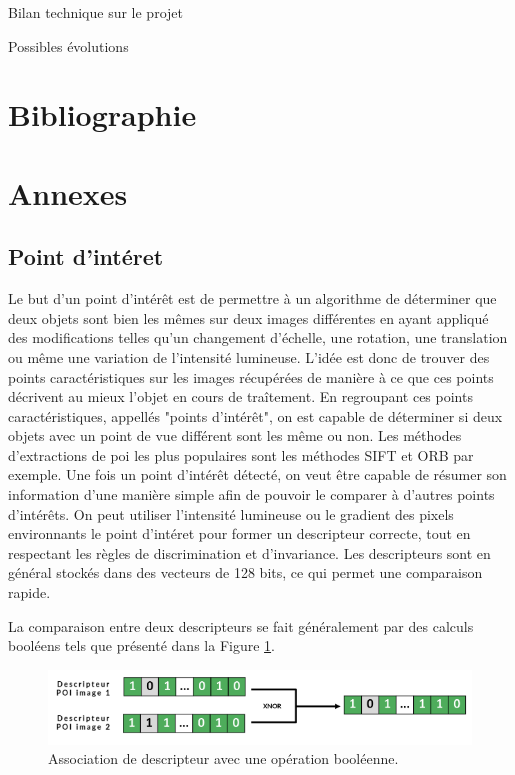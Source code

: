 \documentclass[11pt]{article}
\begin{document}

  Bilan technique sur le projet

  Possibles évolutions

  \pagebreak
  
  \section{Bibliographie}

    \printbibliography[heading=none]

  \pagebreak
  
  \section{Annexes}

    \subsection{Point d'intéret}
      Le but d'un point d'intérêt est de permettre à un algorithme de déterminer que deux objets sont bien les mêmes sur deux images 
      différentes en ayant appliqué des modifications telles qu'un changement d'échelle, une rotation, une translation ou même une 
      variation de l'intensité lumineuse.
      L'idée est donc de trouver des points caractéristiques sur les images récupérées de manière à ce que ces points décrivent au mieux 
      l'objet en cours de traîtement. En regroupant ces points caractéristiques, appellés "points d'intérêt", on est capable de déterminer 
      si deux objets avec un point de vue différent sont les même ou non. Les méthodes d'extractions de \acrshort{poi} les plus populaires 
      sont les méthodes SIFT et ORB par exemple.
      Une fois un point d'intérêt détecté, on veut être capable de résumer son information d'une manière simple afin de pouvoir le comparer
      à d'autres points d'intérêts. On peut utiliser l'intensité lumineuse ou le gradient des pixels environnants le point d'intéret pour 
      former un descripteur correcte, tout en respectant les règles de discrimination et d'invariance. Les descripteurs sont en général 
      stockés dans des vecteurs de 128 bits, ce qui permet une comparaison rapide.

      La comparaison entre deux descripteurs se fait généralement par des calculs booléens tels que présenté dans la 
      Figure \ref{fig:Descripteur}.
      
      \begin{figure}[hbt]  
        \includegraphics[width=\textwidth]{CalculsDescripteurs.png}    
        \caption{Association de descripteur avec une opération booléenne.}
        \label{fig:Descripteur}
      \end{figure} 
\end{document}
